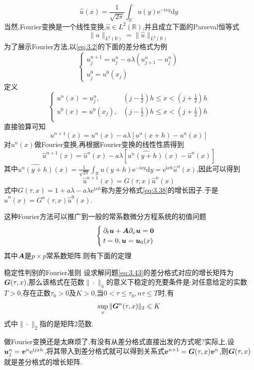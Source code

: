 $$
\hat{u}(x)=\frac{1}{\sqrt{2\pi}}\int_{\mathbb{R}}u(y)\mathrm{e}^{-\mathrm{i}xy}\mathrm{d}y
$$
当然,Fourier变换是一个线性变换,$\hat{u}\in L^2(\mathbb{R})$,并且成立下面的Parseval恒等式
$$
\|u\|_{L^2(\mathbb{R})}=\|\hat{u}\|_{L^2(\mathbb{R})}
$$
\qquad 为了展示Fourier方法,以\eqref{eq:3.2}的下面的差分格式为例
\begin{equation}
    \begin{cases}
        u^{n+1}_j=u^n_j-a\lambda(u^n_{j+1}-u^n_j)\\
        u^0_j=u^0(x_j)
    \end{cases}
    \label{eq:3.38}
\end{equation}
\qquad 定义
$$
\begin{cases}
    u^n(x)=u^n_j,&(j-\frac{1}{2})h\leqslant x<(j+\frac{1}{2})h\\[5pt]
    u^0(x)=u^0(x_j),&(j-\frac{1}{2})h\leqslant x<(j+\frac{1}{2})h\\
\end{cases}
$$
直接验算可知
$$
u^{n+1}(x)=u^n(x)-a\lambda[u^n(x+h)-u^n(x)]
$$
对$u^n(x)$做Fourier变换,再根据Fourier变换的线性性质得到
$$
\hat{u}^{n+1}(x)=\hat{u}^{n}(x)-a\lambda[\widehat{u^n(y+h)}(x)-\hat{u}^{n}(x)]
$$
其中$\widehat{u^n(y+h)}(x)=\frac{1}{\sqrt{2\pi}}\int_{\mathbb{R}}u(y+h)\mathrm{e}^{-\mathrm{i}xy}\mathrm{d}y=\mathrm{e}^{\mathrm{i}xh}\hat{u}^{n}(x)$,因此可以得到
$$
\hat{u}^{n+1}(x)=G(\tau,x)\hat{u}^{n}(x)
$$
式中$G(\tau,x)=1+a\lambda-a\lambda\mathrm{e}^{\mathrm{i}xh}$称为差分格式\eqref{eq:3.38}的增长因子.于是$\hat{u}^{n}(x)=G^n(\tau,x)\hat{u}^{0}(x)$.\par
这种Fourier方法可以推广到一般的常系数微分方程系统的初值问题
\begin{equation}
    \begin{cases}
        \partial_t\bm{u}+\bm{A}\partial_x \bm{u}=\bm{0}\\
        t=0,\bm{u}=\bm{u}_0(x)
    \end{cases}
    \label{eq:3.43}
\end{equation}
其中$\bm{A}$是$p\times p$常系数矩阵.则有下面的定理
\begin{Theorem}{稳定性判别的Fourier准则}
    设求解问题\eqref{eq:3.43}的差分格式对应的增长矩阵为$\bm{G}(\tau,x)$,那么该格式在范数$\|\cdot\|_h$的意义下稳定的充要条件是:对任意给定的实数$T>0$,存在正数$\tau_0>0$及$K>0$,当$0<\tau\leqslant\tau_0,n\tau\leqslant T$时,有
    $$
    \sup_{x}\|\bm{G}^n(\tau,x)\|_2\leqslant K
    $$
    式中$\|\cdot\|_2$指的是矩阵2范数.
\end{Theorem}
做Fourier变换还是太麻烦了,有没有从差分格式直接出发的方式呢?实际上,设$\bm{u}^n_j=\bm{v}^n\mathrm{e}^{\mathrm{i}jxh}$,将其带入到差分格式就可以得到关系式$\bm{v}^{n+1}=\bm{G}(\tau,x)\bm{v}^n$,则$\bm{G}(\tau,x)$就是差分格式的增长矩阵.\par
